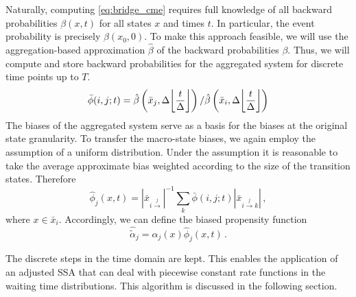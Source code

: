 Naturally, computing \eqref{eq:bridge_cme} requires full knowledge of all backward probabilities $\beta(x, t)$ for all states $x$ and times $t$.
In particular, the event probability is precisely $\beta(x_0, 0)$.
To make this approach feasible, we will use the aggregation-based approximation $\hat{\beta}$ of the backward probabilities $\beta$.
Thus, we will compute and store backward probabilities for the aggregated system for discrete time points up to $T$.
\[
    \bar{\phi}(i, j; t) = \hat{\beta}\left(\bar{x}_j, \Delta\floor*{\frac{t}{\Delta}}\right) / \hat{\beta}\left(\bar{x}_i, \Delta\floor*{\frac{t}{\Delta}}\right)
\]
The biases of the aggregated system serve as a basis for the biases at the original state granularity.
To transfer the macro-state biases, we again employ the assumption of a uniform distribution.
Under the assumption it is reasonable to take the average approximate bias weighted according to the size of the transition states.
Therefore
\[
    \hat{\phi}_j(x, t)
    =
        {\left|\bar{x}_{i\xrightarrow{j}}\right|}^{-1}
        \sum_k
        \bar\phi(i, j; t)
        \left|\bar{x}_{i\xrightarrow{j}k}\right|\,,
\]
where $x\in\bar{x}_i$.
Accordingly, we can define the biased propensity function
\[
    \hat{\tilde{\alpha}}_j
    =
    \alpha_j(x)\hat{\phi}_j(x, t)\,.
\]

The discrete steps in the time domain are kept.
This enables the application of an adjusted \ac{SSA} that can deal with piecewise constant rate functions in the waiting time distributions.
This algorithm is discussed in the following section.

